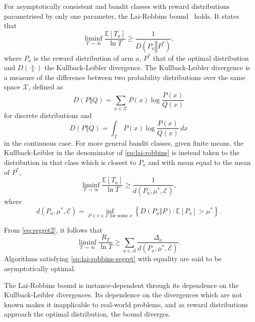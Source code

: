For asymptotically consistent and bandit classes with reward distributions parametrised by only one parameter, the Lai-Robbins bound~\autocite{lai1985} holds.
It states that
\begin{equation}
    \liminf_{T\to\infty} \frac{\mathbb{E}[T_a]}{\ln T} \geq \frac{1}{D(P_a \mathrel{\Vert} P^*)},
    \label{eq:lai-robbins-times}
\end{equation}
where $P_a$ is the reward distribution of arm $a$, $P^*$ that of the optimal distribution and $D(\cdot \mathrel{\Vert} \cdot)$ the Kullback-Leibler divergence.
The Kullback-Leibler divergence is a measure of the difference between two probability distributions over the same space $\mathcal{X}$, defined as
\begin{equation}
    D(P \mathrel{\Vert} Q) = \sum_{x \in \mathcal{X}} P(x) \log \frac{P(x)}{Q(x)}
\end{equation}
for discrete distributions and
\begin{equation}
    D(P \mathrel{\Vert} Q) = \int_{\mathcal{X}} P(x) \log \frac{P(x)}{Q(x)} \, dx
\end{equation}
in the continuous case.
For more general bandit classes, given finite means, the Kullback-Leibler in the denominator of \cref{eq:lai-robbins} is instead taken to the distribution in that class which is closest to $P_a$ and with mean equal to the mean of $P^*$,
\begin{equation}
    \liminf_{T\to\infty} \frac{\mathbb{E}[T_a]}{\ln T} \geq \frac{1}{d(P_a, \mu^*, \mathcal{E})},
    \label{eq:lai-robbins}
\end{equation}
where
\begin{equation}
    d(P_a, \mu^*, \mathcal{E}) =
    \inf_{P \in \nu \in \mathcal{E} \text{ for some } \nu}
    \left\{ D(P_a \mathrel{\Vert} P): \mathbb{E}[P_a] > \mu^* \right\}.
\end{equation}


From \cref{eq:regret2}, it follows that
\begin{equation}
    \liminf_{T\to\infty} \frac{R_T}{\ln T}
    \geq
    \sum_{a \in \mathcal{A}}\frac{\Delta_a}{d(P_a, \mu^*, \mathcal{E})}.
    \label{eq:lai-robbins-regret}
\end{equation}
Algorithms satisfying \cref{eq:lai-robbins-regret} with equality are said to be asymptotically optimal.

The Lai-Robbins bound is instance-dependent through its dependence on the Kullback-Leibler divergences.
Its dependence on the divergences which are not known makes it inapplicable to real-world problems,
and as reward distributions approach the optimal distribution, the bound diverges.


